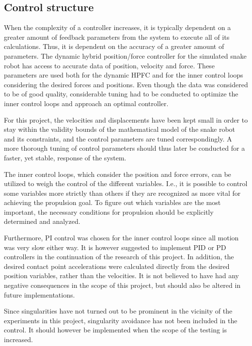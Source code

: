 \subsection{Control structure}

When the complexity of a controller increases, it is typically dependent on a greater amount of feedback parameters from the system to execute all of its calculations. Thus, it is dependent on the accuracy of a greater amount of parameters. The dynamic hybrid position/force controller for the simulated snake robot has access to accurate data of position, velocity and force. These parameters are used both for the dynamic HPFC and for the inner control loops considering the desired forces and positions. Even though the data was considered to be of good quality, considerable tuning had to be conducted to optimize the inner control loops and approach an optimal controller. 

For this project, the velocities and displacements have been kept small in order to stay within the validity bounds of the mathematical model of the snake robot and its constraints, and the control parameters are tuned correspondingly. A more thorough tuning of control parameters should thus later be conducted for a faster, yet stable, response of the system.

The inner control loops, which consider the position and force errors, can be utilized to weigh the control of the different variables. I.e., it is possible to control some variables more strictly than others if they are recognized as more vital for achieving the propulsion goal. To figure out which variables are the most important, the necessary conditions for propulsion should be explicitly determined and analyzed.

Furthermore, PI control was chosen for the inner control loops since all motion was very slow either way. It is however suggested to implement PID or PD controllers in the continuation of the research of this project. In addition, the desired contact point accelerations were calculated directly from the desired position variables, rather than the velocities. It is not believed to have had any negative consequences in the scope of this project, but should also be altered in future implementations.

Since singularities have not turned out to be prominent in the vicinity of the experiments in this project, singularity avoidance has not been included in the control. It should however be implemented when the scope of the testing is increased.

